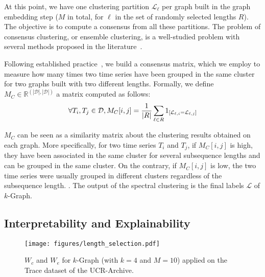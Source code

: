 At this point, we have one clustering partition $\mathcal{L}_\ell$ per graph built in the graph embedding step ($M$ in total, for $\ell$ in the set of randomly selected lengths $R$). 
The objective is to compute a consensus from all these partitions. 
The problem of consensus clustering, or ensemble clustering, is a well-studied problem with several methods proposed in the literature~\cite{Strehl2003ClusterE,Fred2005CombiningMC}.

Following established practice~\cite{Strehl2003ClusterE}, we build a consensus matrix, which we employ to measure how many times two time series have been grouped in the same cluster for two graphs built with two different lengths. 
Formally, we define $M_C \in \mathbb{R}^{(|\mathcal{D}|,|\mathcal{D}|)}$ a matrix computed as follows:
\begin{equation}
\small{
    \forall T_i,T_j \in \mathcal{D}, M_C[i,j] = \frac{1}{|R|}\sum_{\ell \in R} 1_{[\mathcal{L}_{\ell,i} = \mathcal{L}_{\ell,j}]}
}
\end{equation}

$M_C$ can be seen as a similarity matrix about the clustering results obtained on each graph. More specifically, for two time series $T_i$ and $T_j$, if $M_C[i,j]$ is high, they have been associated in the same cluster for several subsequence lengths and can be grouped in the same cluster. On the contrary, if $M_C[i,j]$ is low, the two time series were usually grouped in different clusters regardless of the subsequence length. . 
The output of the spectral clustering is the final labels $\mathcal{L}$ of $k$-Graph.

\subsection{Interpretability and Explainability}
\label{sol:interpretability}

\begin{figure}[tb]
 \centering
\texttt{[image: figures/length\_selection.pdf]}

 \caption{$W_c$ and $W_e$ for $k$-Graph (with $k=4$ and $M=10$) applied on the Trace dataset of the UCR-Archive.}
\vspace{-0.3cm}
 \label{fig:lengthselection}
\end{figure}

